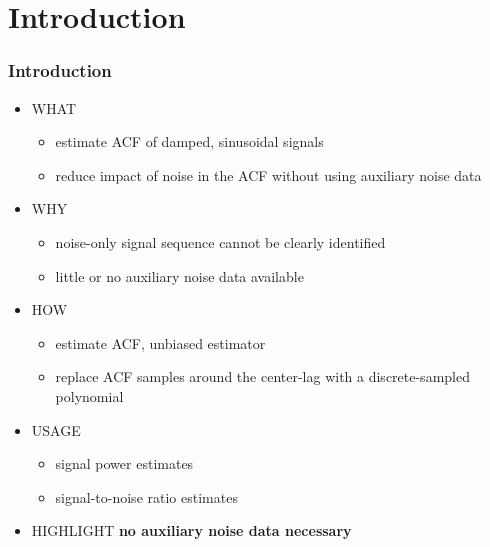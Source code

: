 \documentclass[11pt,aspectratio=169]{beamer}
\begin{document}
	\section{Introduction}
	\begin{frame}
		\frametitle{Introduction}
		\begin{itemize}
			\item \textcolor{RIPtitlecol}{WHAT}
			\begin{itemize}
				\item estimate ACF of damped, sinusoidal signals
				\item reduce impact of noise in the ACF without using auxiliary noise data
			\end{itemize}
			\item \textcolor{RIPtitlecol}{WHY}
			\begin{itemize}
				\item noise-only signal sequence cannot be clearly identified
				\item little or no auxiliary noise data available
			\end{itemize}
			\item \textcolor{RIPtitlecol}{HOW}
			\begin{itemize}
				\item estimate ACF, unbiased estimator
				\item replace ACF samples around the center-lag with a discrete-sampled polynomial
			\end{itemize}
			\item \textcolor{RIPtitlecol}{USAGE}
				\begin{itemize}
					\item signal power estimates
					\item signal-to-noise ratio estimates
				\end{itemize}
			\item \textcolor{RIPtitlecol}{HIGHLIGHT} \textbf{no auxiliary noise data necessary}
		\end{itemize}
	\end{frame}
\end{document}
